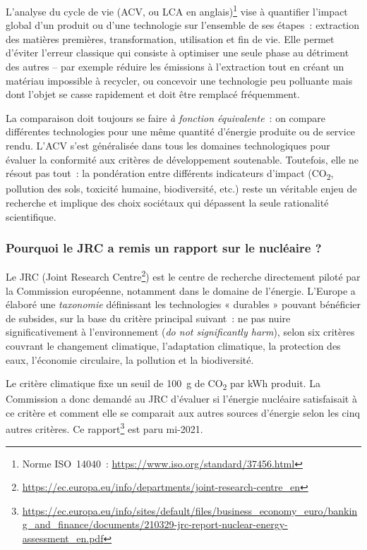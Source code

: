L'analyse du cycle de vie (ACV, ou LCA en anglais)\footnote{Norme ISO~14040~: \url{https://www.iso.org/standard/37456.html}} vise à quantifier l'impact global d'un produit ou d'une technologie sur l'ensemble de ses étapes~: extraction des matières premières, transformation, utilisation et fin de vie. Elle permet d'éviter l'erreur classique qui consiste à optimiser une seule phase au détriment des autres -- par exemple réduire les émissions à l'extraction tout en créant un matériau impossible à recycler, ou concevoir une technologie peu polluante mais dont l'objet se casse rapidement et doit être remplacé fréquemment.

La comparaison doit toujours se faire \emph{à fonction équivalente}~: on compare différentes technologies pour une même quantité d'énergie produite ou de service rendu. L'ACV s'est généralisée dans tous les domaines technologiques pour évaluer la conformité aux critères de développement soutenable. Toutefois, elle ne résout pas tout~: la pondération entre différents indicateurs d'impact (CO\textsubscript{2}, pollution des sols, toxicité humaine, biodiversité, etc.) reste un véritable enjeu de recherche et implique des choix sociétaux qui dépassent la seule rationalité scientifique.

\subsubsection{Pourquoi le JRC a remis un rapport sur le nucléaire ?}

Le JRC (Joint Research Centre\footnote{\url{https://ec.europa.eu/info/departments/joint-research-centre_en}}) est le centre de recherche directement piloté par la Commission européenne, notamment dans le domaine de l'énergie. L'Europe a élaboré une \emph{taxonomie} définissant les technologies « durables » pouvant bénéficier de subsides, sur la base du critère principal suivant~: ne pas nuire significativement à l'environnement (\emph{do not significantly harm}), selon six critères couvrant le changement climatique, l'adaptation climatique, la protection des eaux, l'économie circulaire, la pollution et la biodiversité.

Le critère climatique fixe un seuil de 100~g de CO\textsubscript{2} par kWh produit. La Commission a donc demandé au JRC d'évaluer si l'énergie nucléaire satisfaisait à ce critère et comment elle se comparait aux autres sources d'énergie selon les cinq autres critères. Ce rapport\footnote{\url{https://ec.europa.eu/info/sites/default/files/business_economy_euro/banking_and_finance/documents/210329-jrc-report-nuclear-energy-assessment_en.pdf}} est paru mi-2021.

